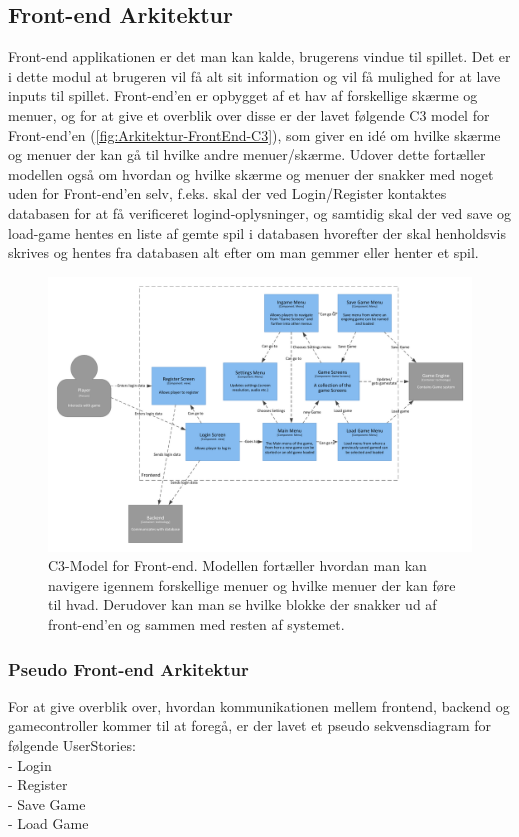 \subsection{Front-end Arkitektur}

Front-end applikationen er det man kan kalde, brugerens vindue til spillet. Det er i dette modul at brugeren vil få alt sit information og vil få mulighed for at lave inputs til spillet. 
Front-end'en er opbygget af et hav af forskellige skærme og menuer, og for at give et overblik over disse er der lavet følgende C3 model for Front-end'en (\autoref{fig:Arkitektur-FrontEnd-C3}), som giver en idé om hvilke skærme og menuer der kan gå til hvilke andre menuer/skærme. Udover dette fortæller modellen også om hvordan og hvilke skærme og menuer der snakker med noget uden for Front-end'en selv, f.eks. skal der ved Login/Register kontaktes databasen for at få verificeret logind-oplysninger, og samtidig skal der ved save og load-game hentes en liste af gemte spil i databasen hvorefter der skal henholdsvis skrives og hentes fra databasen alt efter om man gemmer eller henter et spil.

\begin{figure}[H]
\centering
\includegraphics[width = \textwidth]{02-Body/Images/Frontend_C3.pdf}
\caption{C3-Model for Front-end. Modellen fortæller hvordan man kan navigere igennem forskellige menuer og hvilke menuer der kan føre til hvad. Derudover kan man se hvilke blokke der snakker ud af front-end'en og sammen med resten af systemet.}
\label{fig:Arkitektur-FrontEnd-C3}
\end{figure}

\subsubsection{Pseudo Front-end Arkitektur}
For at give overblik over, hvordan kommunikationen mellem frontend, backend og gamecontroller kommer til at foregå, er der lavet et pseudo sekvensdiagram for følgende UserStories:
\\
- Login\\
- Register\\
- Save Game\\
- Load Game\\

